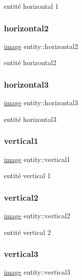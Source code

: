 entité horizontal 1 \mbox{\label{structentity_a098f16f574a5f6b1241bfd513f02860d}} 
\subsubsection{\texorpdfstring{horizontal2}{horizontal2}}
{\footnotesize\ttfamily \hyperlink{structimage}{image} entity\+::horizontal2}

entité horizontal2 \mbox{\label{structentity_a06e43707b5904cea43d244b1b51a2387}} 
\subsubsection{\texorpdfstring{horizontal3}{horizontal3}}
{\footnotesize\ttfamily \hyperlink{structimage}{image} entity\+::horizontal3}

entité horizontal3 \mbox{\label{structentity_aebbf7297dde20fdb9a7d5a599909a0b1}} 
\subsubsection{\texorpdfstring{vertical1}{vertical1}}
{\footnotesize\ttfamily \hyperlink{structimage}{image} entity\+::vertical1}

entité vertical 1 \mbox{\label{structentity_a86d318d932e9df2902488d0aa936b325}} 
\subsubsection{\texorpdfstring{vertical2}{vertical2}}
{\footnotesize\ttfamily \hyperlink{structimage}{image} entity\+::vertical2}

entité vertical 2 \mbox{\label{structentity_a7aee627c58fe68ce10509ce6f001a258}} 
\subsubsection{\texorpdfstring{vertical3}{vertical3}}
{\footnotesize\ttfamily \hyperlink{structimage}{image} entity\+::vertical3}

